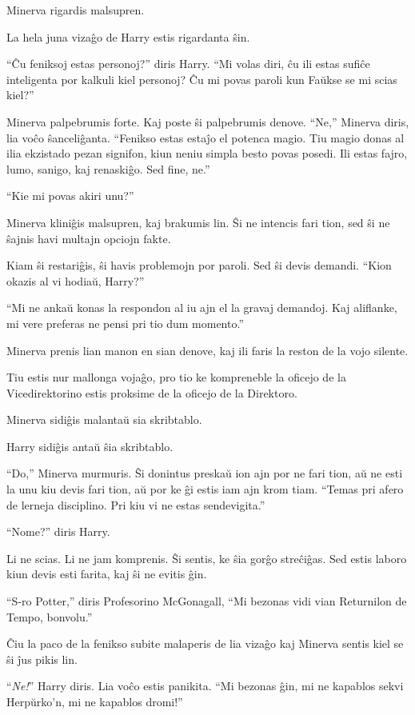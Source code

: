 Minerva rigardis malsupren.

La hela juna vizaĝo de Harry estis rigardanta ŝin.

``Ĉu feniksoj estas personoj?'' diris Harry. ``Mi volas diri, ĉu ili
estas sufiĉe inteligenta por kalkuli kiel personoj? Ĉu mi povas paroli
kun Faŭkse se mi scias kiel?''

Minerva palpebrumis forte. Kaj poste ŝi palpebrumis denove. ``Ne,''
Minerva diris, lia voĉo ŝanceliĝanta. ``Fenikso estas estaĵo el
potenca magio. Tiu magio donas al ilia ekzistado pezan signifon, kiun
neniu simpla besto povas posedi. Ili estas fajro, lumo, sanigo, kaj
renaskiĝo. Sed fine, ne.''

``Kie mi povas akiri unu?''

Minerva kliniĝis malsupren, kaj brakumis lin. Ŝi ne intencis fari
tion, sed ŝi ne ŝajnis havi multajn opciojn fakte.

Kiam ŝi restariĝis, ŝi havis problemojn por paroli. Sed ŝi devis
demandi. ``Kion okazis al vi hodiaŭ, Harry?''

``Mi ne ankaŭ konas la respondon al iu ajn el la gravaj demandoj. Kaj
aliflanke, mi vere preferas ne pensi pri tio dum momento.''

Minerva prenis lian manon en sian denove, kaj ili faris la reston de la vojo silente.

Tiu estis nur mallonga vojaĝo, pro tio ke kompreneble la oficejo de la
Vicedirektorino estis proksime de la oficejo de la Direktoro.

Minerva sidiĝis malantaŭ sia skribtablo.

Harry sidiĝis antaŭ ŝia skribtablo.

``Do,'' Minerva murmuris. Ŝi donintus preskaŭ ion ajn por ne fari
tion, aŭ ne esti la unu kiu devis fari tion, aŭ por ke ĝi estis iam
ajn krom tiam. ``Temas pri afero de lerneja disciplino. Pri kiu vi ne
estas sendevigita.''

``Nome?'' diris Harry.

Li ne scias. Li ne jam komprenis. Ŝi sentis, ke ŝia gorĝo streĉiĝas. Sed estis laboro kiun devis esti farita, kaj ŝi ne evitis ĝin.

``S-ro Potter,'' diris Profesorino McGonagall, ``Mi bezonas vidi vian
Returnilon de Tempo, bonvolu.''

Ĉiu la paco de la fenikso subite malaperis de lia vizaĝo kaj Minerva
sentis kiel se ŝi ĵus pikis lin.

``\emph{Ne!}'' Harry diris. Lia voĉo estis panikita. ``Mi bezonas ĝin,
mi ne kapablos sekvi Herpŭrko'n, mi ne kapablos dromi!''

